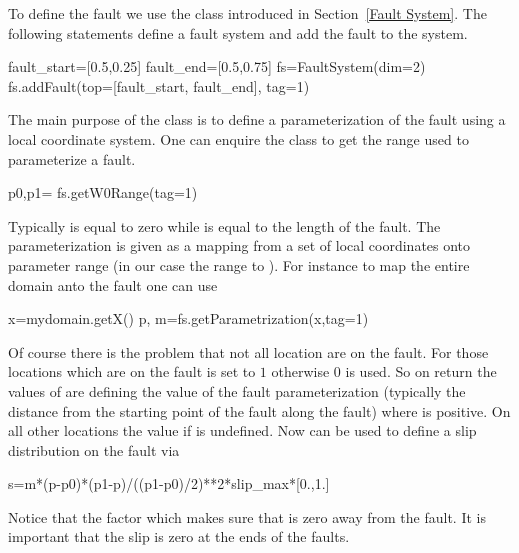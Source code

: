 To define the fault we use the  class introduced in Section~\ref{Fault System}. 
The following statements define a fault system  and add the fault  
to the system.
\begin{python}
fault_start=[0.5,0.25]
fault_end=[0.5,0.75]
fs=FaultSystem(dim=2)
fs.addFault(top=[fault_start, fault_end], tag=1)
\end{python}
The main purpose of the  class is to define a parameterization
of the fault using a local coordinate system. One can enquire the class
to get the range used to parameterize a fault.
\begin{python}
p0,p1= fs.getW0Range(tag=1)
\end{python}
Typically  is equal to zero while  is equal to the length of the fault. The parameterization
is given as a mapping from a set of local coordinates onto parameter range (in our case 
the range  to ). For instance to map the entire domain  anto the fault 
one can use
\begin{python}
x=mydomain.getX()
p, m=fs.getParametrization(x,tag=1)
\end{python}
Of course there is the problem that not all location are on the fault. For those locations which are on the 
fault  is set to $1$ otherwise $0$ is used. So on return the values of  are defining
the value of the fault parameterization (typically the distance from the starting point of the fault along the fault) 
where  is positive. On all other locations the value if  is undefined. Now  can
be used to define a slip distribution on the fault via
\begin{python}
s=m*(p-p0)*(p1-p)/((p1-p0)/2)**2*slip_max*[0.,1.]
\end{python}
Notice that the factor  which makes sure that  is zero away from the fault. It is important
that the slip is zero at the ends of the faults.

